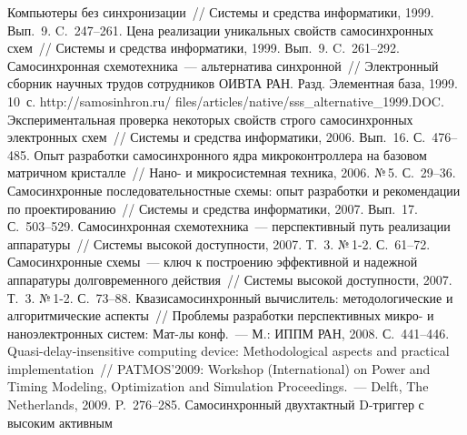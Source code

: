 \begin{multicols}{2}
{{\begin{thebibliography}{99}
 Компьютеры без синхронизации~// Системы и 
средства информатики, 1999. Вып.~9. C.~247--261.
Цена реализации уникальных свойств самосинхронных схем~// Системы и средства 
информатики, 1999. Вып.~9. C.~261--292.
 Самосинхронная 
схемотехника~--- альтернатива синхронной~// Электронный сборник научных трудов 
сотрудников \mbox{ОИВТА} РАН. Разд. Элементная база, 1999. 10~с.
{\sf http://samosinhron.ru/ files/articles/native/sss\_alternative\_1999.DOC}. 
  Экспериментальная проверка некоторых свойств 
строго самосинхронных электронных схем~// Системы и средства информатики, 
2006. Вып.~16. С.~476--485.
 Опыт разработки 
самосинхронного ядра микроконтроллера на базовом матричном кристалле~// Нано- и 
микросистемная техника, 2006. №\,5. С.~29--36.
 Самосинхронные 
последовательностные схемы: опыт разработки и рекомендации по проектированию~// 
Системы и средства информатики, 2007. Вып.~17. С.~503--529.
Самосинхронная схемотехника~--- перспективный путь реализации аппаратуры~// 
Системы высокой доступности, 2007. Т.~3. №\,1-2. С.~61--72.
Самосинхронные схемы~--- ключ к построению эффективной и надежной аппаратуры 
долговременного действия~// Системы высокой доступности, 2007. Т.~3. №\,1-2. 
С.~73--88.
 Квазисамосинхронный 
вычислитель: методологические и алгоритмические аспекты~// Проблемы разработки 
перспективных микро- и наноэлектронных сис\-тем: Мат-лы конф.~--- М.: ИППМ 
РАН, 2008. С.~441--446.
 Quasi-delay-insensitive computing device: Methodological aspects and 
practical implementation~// PATMOS'2009: Workshop (International) on Power and Timing 
Modeling, Optimization and Simulation Proceedings.~--- Delft, The Netherlands, 2009. 
P.~276--285.
 Самосинхронный двухтактный D-триг\-гер с высоким активным 

\end{thebibliography}}}
\end{multicols}
